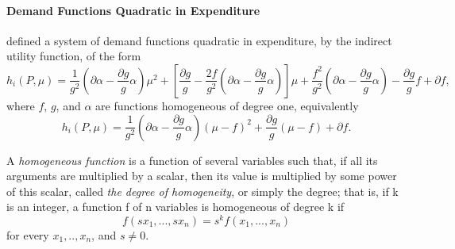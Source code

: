 \paragraph{Demand Functions Quadratic in Expenditure\\}{
\cite{Howe1979} defined a system of demand functions quadratic in expenditure, by the indirect utility function, of the form
	\begin{equation} \label{eq2.2}
		h_i(P,\mu) = \frac{1}{g^2}(\partial \alpha - \frac{\partial g}{g} \alpha) \mu^2 + [\frac{\partial g}{g} - \frac{2f}{g^2}(\partial \alpha -\frac{\partial g}{g} \alpha )] \mu + \frac{f^2}{g^2}(\partial \alpha - \frac{\partial g}{g} \alpha) - \frac{\partial g}{g}f + \partial f,
	\end{equation}
where $f$, $g$, and $\alpha$ are functions homogeneous of degree one, equivalently
	\begin{equation} \label{eq2.3}
		h_i(P,\mu) = \frac{1}{g^2}(\partial \alpha - \frac{\partial g}{g} \alpha) (\mu - f)^2 + \frac{\partial g}{g} (\mu - f) + \partial f.
	\end{equation}

 \small{A \textit{homogeneous function} is a function of several variables such that, if all its arguments are multiplied by a scalar, then its value is multiplied by some power of this scalar, called \textit{the degree of homogeneity}, or simply the degree; that is, if k is an integer, a function f of n variables is homogeneous of degree k if
	\begin{equation}\label{eq2.3a}
		f(sx_1,...,sx_n)=s^kf(x_1,...,x_n)  
	\end{equation}
for every $x_1,..,x_n$, and $s \neq 0$.
 }
}

